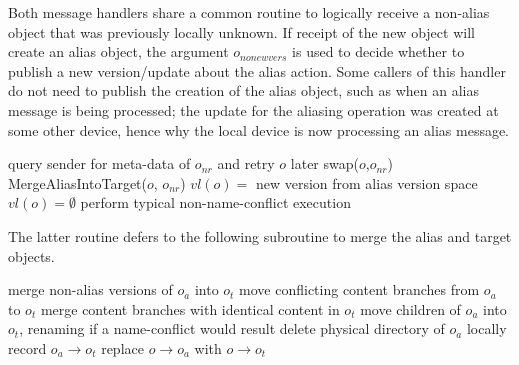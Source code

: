 Both message handlers share a common routine to logically receive a non-alias
object that was previously locally unknown. If receipt of the new object will
create an alias object, the argument $o_{nonewvers}$ is used to decide whether
to publish a new version/update about the alias action. Some callers of this
handler do not need to publish the creation of the alias object, such as when
an alias message is being processed; the update for the aliasing operation was
created at some other device, hence why the local device is now processing an
alias message.
\begin{algorithmic}
        \State query sender for meta-data of $o_{nr}$ and retry $o$ later
        \State \Return
    \EndIf
        \State swap($o$,$o_{nr}$)
    \EndIf
    \State MergeAliasIntoTarget($o$, $o_{nr}$)
        \State $vl(o) =$ new version from alias version space
    \Else
        \State $vl(o) = \emptyset$
    \EndIf
\Else
    \State perform typical non-name-conflict execution
\EndIf
\EndFunction
\end{algorithmic}
The latter routine defers to the following subroutine to merge the alias and
target objects.
\begin{algorithmic}
\State merge non-alias versions of $o_a$ into $o_t$
    \State move conflicting content branches from $o_a$ to $o_t$
    \State merge content branches with identical content in $o_t$
    \State move children of $o_a$ into $o_t$, renaming if a name-conflict would
result
    \State delete physical directory of $o_a$
\EndIf
\State locally record $o_a \rightarrow o_t$
    \State replace $o\rightarrow o_a$ with $o\rightarrow o_t$
\EndFor
\EndFunction
\end{algorithmic}

